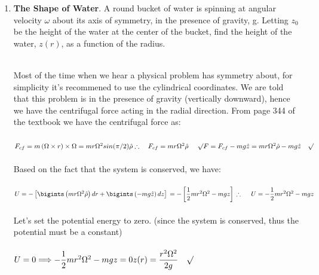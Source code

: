 \documentclass[fleqn]{article}
\begin{document}
  \begin{enumerate}
    \item \textbf{The Shape of Water}. A round bucket of water is spinning at angular velocity $\omega$ about its axis of symmetry, 
    in the presence of gravity, g. Letting $z_0$ be the height of the water at the center of the bucket, find the height of the water, $z(r)$, as a function of the radius.

      \textcolor{hwColor}{
        \\
        Most of the time when we hear a physical problem has symmetry about, for simplicity it's recommened 
        to use the cylindrical coordinates. We are told that this problem is in the presence of gravity (vertically downward),
        hence we have the centrifugal force acting in the radial direction. From page 344 of the textbook we have the centrifugal force as:
        \\
        \\
        $
          F_{cf}=m \left(\Omega \times r\right) \times \Omega
          \\
          \\
          =mr\Omega^2 sin(\pi/2) \hat{\rho}
          \\
          \\
          \therefore ~~~ F_{cf}=mr \Omega^2 \hat{\rho} ~~~~ \surd
          \\
          \\
          F=F_{cf}-mg \hat{z}=mr \Omega^2 \hat{\rho}-mg \hat{z} ~~~ \surd
        $
        \\
        \\
        Based on the fact that the system is conserved, we have: 
        \\
        \\
        $
          U=-\left[\bigints \left(mr \Omega^2 \hat{\rho}\right) dr+ \bigints \left(-mg \hat{z}\right) dz\right]
          \\
          \\
          =-\left[\dfrac{1}{2}mr^2 \Omega^2-mgz\right]
          \\
          \\
          \\
          \therefore ~~~~ U=-\dfrac{1}{2}mr^2 \Omega^2-mgz
        $
        \\
        \\
        Let's set the potential energy to zero. (since the system is conserved, thus the potential must be a constant) 
        \\
        \\
        $
          U=0 \Longrightarrow -\dfrac{1}{2}mr^2 \Omega^2-mgz=0
          \\
          \\
          \\
          z(r)=\dfrac{r^2 \Omega^2}{2g} ~~~ \surd
        $
      }


\end{enumerate}
\end{document}
